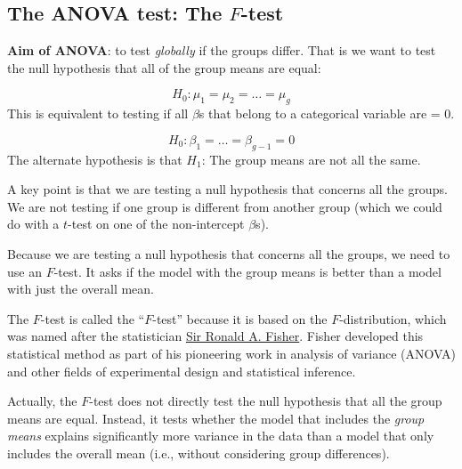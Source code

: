 \documentclass[
  letterpaper,
  8pt,
  a4paper]{book}
\begin{document}
\subsection*{\texorpdfstring{The ANOVA test: The
\(F\)-test}{The ANOVA test: The F-test}}\label{the-anova-test-the-f-test}

\textbf{Aim of ANOVA}: to test \emph{globally} if the groups differ.
That is we want to test the null hypothesis that all of the group means
are equal:

\[H_0: \mu_1=\mu_2=\ldots = \mu_g\] This is equivalent to testing if all
\(\beta\)s that belong to a categorical variable are = 0.

\[H_0: \beta_1 = \ldots = \beta_{g-1} = 0\] The alternate hypothesis is
that \({H_1}\): The group means are not all the same.

A key point is that we are testing a null hypothesis that concerns all
the groups. We are not testing if one group is different from another
group (which we could do with a \(t\)-test on one of the non-intercept
\(\beta\)s).

Because we are testing a null hypothesis that concerns all the groups,
we need to use an \(F\)-test. It asks if the model with the group means
is better than a model with just the overall mean.

\begin{tcolorbox}[enhanced jigsaw, arc=.35mm, bottomrule=.15mm, bottomtitle=1mm, breakable, colback=white, colbacktitle=quarto-callout-note-color!10!white, colframe=quarto-callout-note-color-frame, coltitle=black, left=2mm, leftrule=.75mm, opacityback=0, opacitybacktitle=0.6, rightrule=.15mm, title=\textcolor{quarto-callout-note-color}{\faInfo}\hspace{0.5em}{Note}, titlerule=0mm, toprule=.15mm, toptitle=1mm]

The \(F\)-test is called the ``\(F\)-test'' because it is based on the
\(F\)-distribution, which was named after the statistician
\href{https://en.wikipedia.org/wiki/Ronald_Fisher}{Sir Ronald A.
Fisher}. Fisher developed this statistical method as part of his
pioneering work in analysis of variance (ANOVA) and other fields of
experimental design and statistical inference.

\end{tcolorbox}

Actually, the \(F\)-test does not directly test the null hypothesis that
all the group means are equal. Instead, it tests whether the model that
includes the \emph{group means} explains significantly more variance in
the data than a model that only includes the overall mean (i.e., without
considering group differences).
\end{document}

